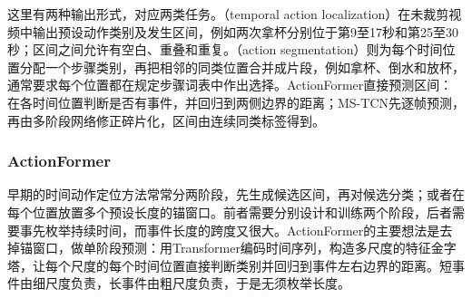 这里有两种输出形式，对应两类任务。（temporal action localization）在未裁剪视频中输出预设动作类别及发生区间，例如两次拿杯分别位于第9至17秒和第25至30秒；区间之间允许有空白、重叠和重复。（action segmentation）则为每个时间位置分配一个步骤类别，再把相邻的同类位置合并成片段，例如拿杯、倒水和放杯，通常要求每个位置都在规定步骤词表中作出选择。ActionFormer直接预测区间：在各时间位置判断是否有事件，并回归到两侧边界的距离；MS-TCN先逐帧预测，再由多阶段网络修正碎片化，区间由连续同类标签得到。

\subsubsection{ActionFormer}
\label{sec:vision-video-actionformer}

早期的时间动作定位方法常常分两阶段，先生成候选区间，再对候选分类；或者在每个位置放置多个预设长度的锚窗口。前者需要分别设计和训练两个阶段，后者需要事先枚举持续时间，而事件长度的跨度又很大。ActionFormer的主要想法是去掉锚窗口，做单阶段预测：用Transformer编码时间序列，构造多尺度的特征金字塔，让每个尺度的每个时间位置直接判断类别并回归到事件左右边界的距离。短事件由细尺度负责，长事件由粗尺度负责，于是无须枚举长度。

